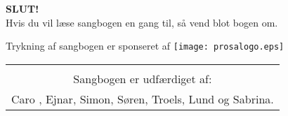 \newpage
\newpage

\begin{center}
{\Huge \textbf{SLUT!}}\\
\vspace{6cm}
{\large Hvis du vil læse sangbogen en gang til, så vend blot bogen
  om.}\\

\vspace{3cm}

{\large Trykning af sangbogen er sponseret af}
\texttt{[image: prosalogo.eps]}


\begin{tabular}{c}
\vspace{3cm}
\\
Sangbogen er udfærdiget af:\\
Caro , Ejnar, Simon, Søren, Troels, Lund og Sabrina.
\end{tabular}
\end{center}
